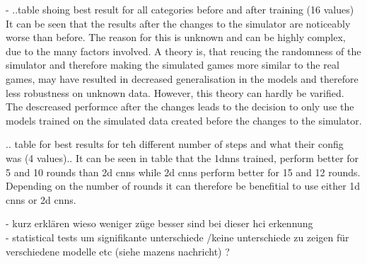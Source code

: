 - ..table shoing best result for all categories before and after training (16 values)
It can be seen that the results after the changes to the simulator are noticeably worse than before. The reason for this is unknown and can be highly complex, due to the many factors involved. A theory is, that reucing the randomness of the simulator and therefore making the simulated games more similar to the real games, may have resulted in decreased generalisation in the models and therefore less robustness on unknown data. However, this theory can hardly be varified. The descreased performce after the changes leads to the decision to only use the models trained on the simulated data created before the changes to the simulator. 

.. table for best results for teh different number of steps and what their config was (4 values)..
It can be seen in table  that the 1dnns trained, perform better for 5 and 10 rounds than 2d cnns while 2d cnns perform better for 15 and 12 rounds. Depending on the number of rounds it can therefore be benefitial to use either 1d cnns or 2d cnns. 


- kurz erklären wieso weniger züge besser sind bei dieser hci erkennung\\
- statistical tests um signifikante unterschiede /keine unterschiede zu zeigen für verschiedene modelle etc (siehe mazens nachricht) ? \\
